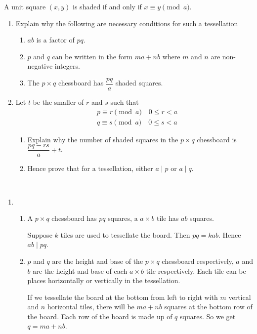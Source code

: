 \begin{enumerate}
A unit square $(x,y)$ is shaded if and only if $x \equiv y \pmod a$.
\begin{enumerate}[label=(\roman*)]
\item Explain why the following are necessary conditions for such a tessellation
    \begin{enumerate}[label=(\alph*)]
    \item $ab$ is a factor of $pq$.
    \item $p$ and $q$ can be written in the form $ma+nb$ where $m$ and $n$ are non-negative integers.
    \item The $p \times q$ chessboard has $\dfrac{pq}{a}$ shaded squares.
    \end{enumerate}
\item Let $t$ be the smaller of $r$ and $s$ such that
\begin{align*}
&p \equiv r \pmod a \quad 0 \le r < a \\
&q \equiv s \pmod a \quad 0 \le s < a
\end{align*}
    \begin{enumerate}[label=(\alph*)]
    \item Explain why the number of shaded squares in the $p \times q$ chessboard is $\dfrac{pq-rs}{a}+t$.
    \item Hence prove that for a tessellation, either $a \mid p$ or $a \mid q$.
    \end{enumerate}
\end{enumerate}

\begin{solution} \
\begin{enumerate}[label=(\roman*)]
\item \begin{enumerate}[label=(\alph*)]
    \item A $p \times q$ chessboard has $pq$ squares, a $a \times b$ tile has $ab$ squares.
    
    Suppose $k$ tiles are used to tessellate the board. Then $pq=kab$. Hence $ab\mid pq$.

    \item $p$ and $q$ are the height and base of the $p \times q$ chessboard respectively, $a$ and $b$ are the height and base of each $a \times b$ tile respectively. Each tile can be places horizontally or vertically in the tessellation.
    
    If we tessellate the board at the bottom from left to right with $m$ vertical and $n$ horizontal tiles, there will be $ma+nb$ squares at the bottom row of the board. Each row of the board is made up of $q$ squares. So we get $q=ma+nb$.
    

\end{enumerate}
\end{enumerate}
\end{solution}
\end{enumerate}
